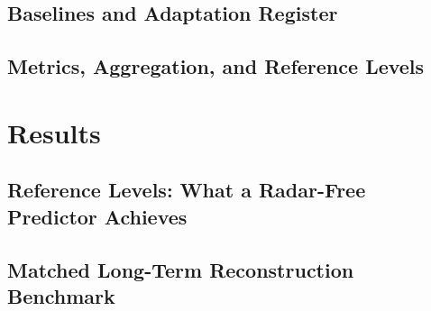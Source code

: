 \documentclass[lettersize,journal]{IEEEtran}
\begin{document}
\subsection{Baselines and Adaptation Register}
\label{sec:protocol_details}

\subsection{Metrics, Aggregation, and Reference Levels}
\label{sec:metrics}

\section{Results}
\label{sec:results}

\subsection{Reference Levels: What a Radar-Free Predictor Achieves}
\label{sec:floor}

\subsection{Matched Long-Term Reconstruction Benchmark}
\label{sec:benchmark}


\end{document}
